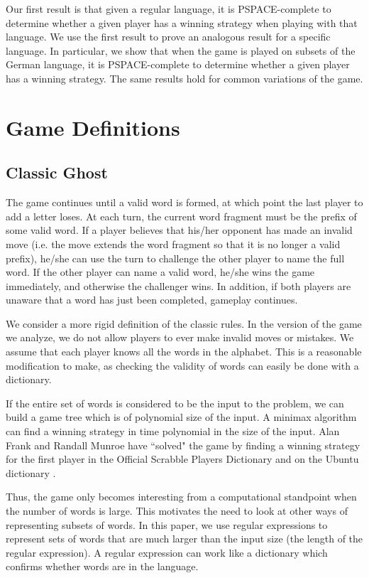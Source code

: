 \documentclass[runningheads,a4paper]{llncs}
\begin{document}
	Our first result is that given a regular language, it is PSPACE-complete to determine whether a given player has a winning strategy when playing with that language. We use the first result to prove an analogous result for a specific language. In particular, we show that when the game is played on subsets of the German language, it is PSPACE-complete to determine whether a given player has a winning strategy. The same results hold for common variations of the game.

\section{Game Definitions}
\label{Game Definitions}

\subsection{Classic Ghost}

The game continues until a valid word is formed, at which point the last player to add a letter loses. At each turn, the current word fragment must be the prefix of some valid word. If a player believes that his/her opponent has made an invalid move (i.e. the move extends the word fragment so that it is no longer a valid prefix), he/she can use the turn to challenge the other player to name the full word. If the other player can name a valid word, he/she wins the game immediately, and otherwise the challenger wins. In addition, if both players are unaware that a word has just been completed, gameplay continues.

	We consider a more rigid definition of the classic rules. In the version of the game we analyze, we do not allow players to ever make invalid moves or mistakes. We assume that each player knows all the words in the alphabet. This is a reasonable modification to make, as checking the validity of words can easily be done with a dictionary.

	If the entire set of words is considered to be the input to the problem, we can build a game tree which is of polynomial size of the input. A minimax algorithm can find a winning strategy in time polynomial in the size of the input. Alan Frank and Randall Munroe have ``solved" the game by finding a winning strategy for the first player in the Official Scrabble Players Dictionary and on the Ubuntu dictionary \cite{ghostbusters} \cite{randall}. 

	Thus, the game only becomes interesting from a computational standpoint when the number of words is large. This motivates the need to look at other ways of representing subsets of words. In this paper, we use regular expressions to represent sets of words that are much larger than the input size (the length of the regular expression). A regular expression can work like a dictionary which confirms whether words are in the language.
\end{document}
